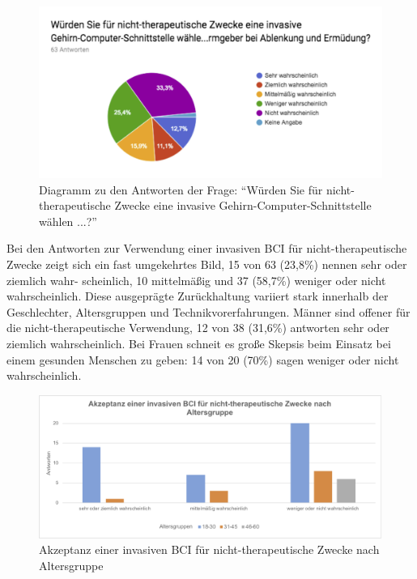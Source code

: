 \documentclass[11pt,ngerman,parskip=half]{scrartcl}
\begin{document}
\begin{figure}[H]
  \centering
  \includegraphics[width=1.0\textwidth]{src/img/kathrin3.png}
  \caption{Diagramm zu den Antworten der Frage: \enquote{Würden Sie für
  nicht-therapeutische Zwecke eine invasive Gehirn-Computer-Schnittstelle
  wählen ...?}}
  \label{img:kathrin3}
\end{figure}

Bei den Antworten zur Verwendung einer invasiven BCI für nicht-therapeutische
Zwecke zeigt sich ein fast umgekehrtes Bild, 15 von 63 (23,8\%) nennen sehr
oder ziemlich wahr- scheinlich, 10 mittelmäßig und 37 (58,7\%) weniger oder
nicht wahrscheinlich. Diese ausgeprägte Zurückhaltung variiert stark
innerhalb der Geschlechter, Altersgruppen und Technikvorerfahrungen. Männer
sind offener für die nicht-therapeutische Verwendung, 12 von 38 (31,6\%)
antworten sehr oder ziemlich wahrscheinlich. Bei Frauen schneit es große
Skepsis beim Einsatz bei einem gesunden Menschen zu geben: 14 von 20 (70\%)
sagen weniger oder nicht wahrscheinlich.

\begin{figure}[H]
  \centering
  \includegraphics[width=1.0\textwidth]{src/img/kathrin4.png}
  \caption{Akzeptanz einer invasiven BCI für nicht-therapeutische Zwecke nach
  Altersgruppe}
  \label{img:kathrin4}
\end{figure}
\end{document}
